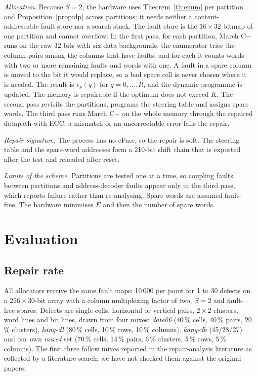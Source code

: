 \documentclass[conference]{IEEEtran}
\begin{document}
\emph{Allocation.} Because $S=2$, the hardware uses Theorem~\ref{th:enum} per partition and
Proposition~\ref{prop:dp} across partitions; it needs neither a content-addressable fault store nor a
search stack. The fault store is the $16\times32$ bitmap of one partition and cannot overflow. In the
first pass, for each partition, March C$-$ \cite{vandegoor1993} runs on the raw 32 bits with six data
backgrounds, the enumerator tries the column pairs among the columns that have faults, and for each
it counts words with two or more remaining faults and words with one. A fault in a spare column is
moved to the bit it would replace, so a bad spare cell is never chosen where it is needed. The result
is $e_p(q)$ for $q=0,\dots,R$, and the dynamic programme is updated. The memory is repairable if the
optimum does not exceed $K$. The second pass revisits the partitions, programs the steering table and
assigns spare words. The third pass runs March C$-$ on the whole memory through the repaired datapath
with ECC; a mismatch or an uncorrectable error fails the repair.

\emph{Repair signature.} The process has no eFuse, so the repair is soft. The steering table and the
spare-word addresses form a 210-bit shift chain that is exported after the test and reloaded after
reset.

\emph{Limits of the scheme.} Partitions are tested one at a time, so coupling faults between
partitions and address-decoder faults appear only in the third pass, which reports failure rather
than re-analysing. Spare words are assumed fault-free. The hardware minimises $E$ and then the number
of spare words.

\section{Evaluation}\label{sec:eval}
\subsection{Repair rate}
All allocators receive the same fault maps: 10\,000 per point for 1 to 30 defects on a
$256\times30$-bit array with a column multiplexing factor of two, $S=2$ and fault-free spares. Defects
are single cells, horizontal or vertical pairs, $2\times2$ clusters, word lines and bit lines, drawn
from four mixes: \emph{date06} (40\,\% cells, 40\,\% pairs, 20\,\% clusters), \emph{kang-dl} (80\,\%
cells, 10\,\% rows, 10\,\% columns), \emph{kang-dh} (45/28/27) and our own \emph{mixed} set (70\,\% cells,
14\,\% pairs, 6\,\% clusters, 5\,\% rows, 5\,\% columns). The first three follow mixes reported in the
repair-analysis literature as collected by a literature search; we have not checked them against the
original papers.
\end{document}
